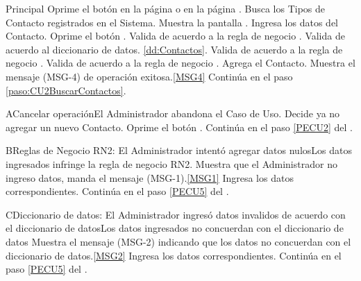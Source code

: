 	\begin{UCtrayectoria}{Principal}
			\UCpaso[\UCactor] Oprime el botón  en la página  o en la página .
                        \UCpaso Busca los Tipos de Contacto registrados en el Sistema.
			\UCpaso Muestra la pantalla .
		        \UCpaso [\UCactor] Ingresa los datos del Contacto.\label{paso:CU2ValidacionDatosNuevosContactos} 
                	\UCpaso [\UCactor] Oprime el botón .\label{PECU5}
                        \UCpaso Valida de acuerdo a la regla de negocio .  
                        \UCpaso Valida de acuerdo al diccionario de datos.  \ref{dd:Contactos}. 
                        \UCpaso Valida de acuerdo a la regla de negocio . 
			\UCpaso Valida de acuerdo a la regla de negocio . 
			\UCpaso Agrega el Contacto.
			\UCpaso Muestra el mensaje (MSG-4) de operación exitosa.\ref{MSG4}
			\UCpaso Continúa en el paso \ref{paso:CU2BuscarContactos}.
	\end{UCtrayectoria}

	\begin{UCtrayectoriaA}{A}{Cancelar operación}{El Administrador abandona el Caso de Uso.}
			\UCpaso[\UCactor] Decide ya no agregar un nuevo Contacto.
			\UCpaso[\UCactor] Oprime el botón .
			\UCpaso Continúa en el paso \ref{PECU2} del .
	\end{UCtrayectoriaA}

        \begin{UCtrayectoriaA}{B}{Reglas de Negocio RN2: El Administrador intentó agregar datos nulos}{Los datos ingresados infringe la regla de negocio RN2.}
                        \UCpaso Muestra que el Administrador no ingreso datos, manda el mensaje (MSG-1).\ref{MSG1}
			\UCpaso[\UCactor] Ingresa los datos correspondientes.
			\UCpaso Continúa en el paso \ref{PECU5} del .
	\end{UCtrayectoriaA}

        \begin{UCtrayectoriaA}{C}{Diccionario de datos: El Administrador ingresó datos invalidos de acuerdo con el diccionario de datos}{Los datos ingresados no concuerdan con el diccionario de datos}
                        \UCpaso Muestra el mensaje (MSG-2) indicando que los datos no concuerdan con el diccionario de datos.\ref{MSG2}
			\UCpaso[\UCactor] Ingresa los datos correspondientes.
			\UCpaso Continúa en el paso \ref{PECU5} del .
	\end{UCtrayectoriaA}

